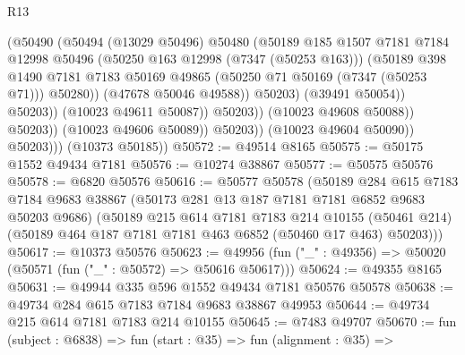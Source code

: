 \begin{lexlean}{R13}
\begin{coremodule}
                                      (@50490
                                        (@50494
                                          (@13029 @50496)
                                          @50480
                                          (@50189
                                            @185
                                            @1507
                                            @7181
                                            @7184
                                            @12998
                                            @50496
                                            (@50250 @163 @12998 (@7347 (@50253 @163)))
                                            (@50189
                                              @398
                                              @1490
                                              @7181
                                              @7183
                                              @50169
                                              @49865
                                              (@50250 @71 @50169 (@7347 (@50253 @71)))
                                              @50280))
                                          (@47678 @50046 @49588))
                                        @50203)
                                      (@39491 @50054))
                                    @50203))
                                (@10023 @49611 @50087))
                              @50203))
                          (@10023 @49608 @50088))
                        @50203))
                    (@10023 @49606 @50089))
                  @50203))
              (@10023 @49604 @50090))
            @50203)))
      (@10373 @50185))
@50572 := @49514 @8165
@50575 := @50175 @1552 @49434 @7181
@50576 := @10274 @38867
@50577 := @50575 @50576
@50578 := @6820 @50576
@50616 := @50577
    @50578
    (@50189
      @284
      @615
      @7183
      @7184
      @9683
      @38867
      (@50173 @281 @13 @187 @7181 @7181 @6852 @9683 @50203 @9686)
      (@50189
        @215
        @614
        @7181
        @7183
        @214
        @10155
        (@50461 @214)
        (@50189 @464 @187 @7181 @7181 @463 @6852 (@50460 @17 @463) @50203)))
@50617 := @10373 @50576
@50623 := @49956 (fun ("_" : @49356) => @50020 (@50571 (fun ("_" : @50572) => @50616 @50617)))
@50624 := @49355 @8165
@50631 := @49944 @335 @596 @1552 @49434 @7181 @50576 @50578
@50638 := @49734 @284 @615 @7183 @7184 @9683 @38867 @49953
@50644 := @49734 @215 @614 @7181 @7183 @214 @10155
@50645 := @7483 @49707
@50670 := fun (subject : @6838) =>
  fun (start : @35) =>
  fun (alignment : @35) =>

\end{coremodule}
\end{lexlean}

